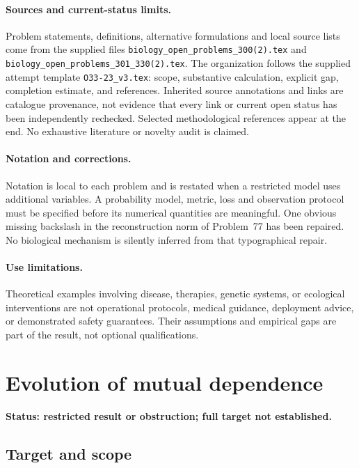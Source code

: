 \documentclass[11pt]{article}
\begin{document}
\paragraph{Sources and current-status limits.}
Problem statements, definitions, alternative formulations and local source lists
come from the supplied files
\texttt{biology\_open\_problems\_300(2).tex} and
\texttt{biology\_open\_problems\_301\_330(2).tex}.
The organization follows the supplied attempt template
\texttt{O33-23\_v3.tex}: scope, substantive calculation, explicit gap,
completion estimate, and references. Inherited source annotations and links are
catalogue provenance, not evidence that every link or current open status has
been independently rechecked. Selected methodological references appear at the
end. No exhaustive literature or novelty audit is claimed.

\paragraph{Notation and corrections.}
Notation is local to each problem and is restated when a restricted model uses
additional variables. A probability model, metric, loss and observation protocol
must be specified before its numerical quantities are meaningful. One obvious
missing backslash in the reconstruction norm of Problem~77 has been repaired.
No biological mechanism is silently inferred from that typographical repair.

\paragraph{Use limitations.}
Theoretical examples involving disease, therapies, genetic systems, or ecological
interventions are not operational protocols, medical guidance, deployment advice,
or demonstrated safety guarantees. Their assumptions and empirical gaps are part
of the result, not optional qualifications.


\section*{Evolution of mutual dependence}
\label{prob:155}
\noindent\textbf{Status: restricted result or obstruction; full target not established.}
\subsection{Target and scope}
\end{document}
